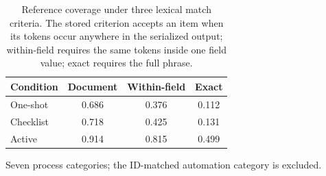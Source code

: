 \begin{table}[t]
\caption{Reference coverage under three lexical match criteria. The stored criterion accepts an item when its tokens occur anywhere in the serialized output; within-field requires the same tokens inside one field value; exact requires the full phrase.}
\label{tab:criterion-band}
\centering
\small
\begin{tabular}{lccc}
\toprule
Condition & Document & Within-field & Exact \\
\midrule
One-shot & 0.686 & 0.376 & 0.112 \\
Checklist & 0.718 & 0.425 & 0.131 \\
Active & 0.914 & 0.815 & 0.499 \\
\bottomrule
\end{tabular}
\par\vspace{2pt}\footnotesize Seven process categories; the ID-matched automation category is excluded.
\end{table}
